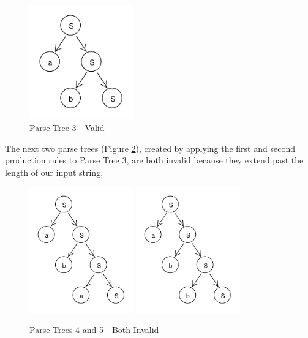 \documentclass[11pt]{article}
\begin{document}
{\begin{figure}[h!]
    \centering
    \includegraphics[width=0.4\textwidth,natwidth=30,natheight=30]{umlet/rdp_3.pdf}
    \caption{Parse Tree 3 - Valid}
    \label{fig:rdp_3}
\end{figure}

The next two parse trees (Figure \ref{fig:rdp_4_5}), created by applying the first and second production rules to
Parse Tree 3, are both invalid because they extend past the length of our input string.

\begin{figure}[h!]
    \centering
    \includegraphics[width=0.4\textwidth,natwidth=30,natheight=30]{umlet/rdp_4.pdf}
    \includegraphics[width=0.4\textwidth,natwidth=30,natheight=30]{umlet/rdp_5.pdf}
    \caption{Parse Trees 4 and 5 - Both Invalid}
    \label{fig:rdp_4_5}
\end{figure}

}
\end{document}
